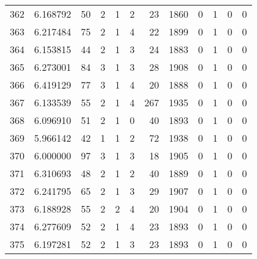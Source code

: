 \begin{tabular}{lrrrrrrrrrrr}
362 &  6.168792 &   50 &      2 &        1 &      2 &              23 &  1860 &               0 &               1 &               0 &               0 \\
363 &  6.217484 &   75 &      2 &        1 &      4 &              22 &  1899 &               0 &               1 &               0 &               0 \\
364 &  6.153815 &   44 &      2 &        1 &      3 &              24 &  1883 &               0 &               1 &               0 &               0 \\
365 &  6.273001 &   84 &      3 &        1 &      3 &              28 &  1908 &               0 &               1 &               0 &               0 \\
366 &  6.419129 &   77 &      3 &        1 &      4 &              20 &  1888 &               0 &               1 &               0 &               0 \\
367 &  6.133539 &   55 &      2 &        1 &      4 &             267 &  1935 &               0 &               1 &               0 &               0 \\
368 &  6.096910 &   51 &      2 &        1 &      0 &              40 &  1893 &               0 &               1 &               0 &               0 \\
369 &  5.966142 &   42 &      1 &        1 &      2 &              72 &  1938 &               0 &               1 &               0 &               0 \\
370 &  6.000000 &   97 &      3 &        1 &      3 &              18 &  1905 &               0 &               1 &               0 &               0 \\
371 &  6.310693 &   48 &      2 &        1 &      2 &              40 &  1889 &               0 &               1 &               0 &               0 \\
372 &  6.241795 &   65 &      2 &        1 &      3 &              29 &  1907 &               0 &               1 &               0 &               0 \\
373 &  6.188928 &   55 &      2 &        2 &      4 &              20 &  1904 &               0 &               1 &               0 &               0 \\
374 &  6.277609 &   52 &      2 &        1 &      4 &              23 &  1893 &               0 &               1 &               0 &               0 \\
375 &  6.197281 &   52 &      2 &        1 &      3 &              23 &  1893 &               0 &               1 &               0 &               0 \\

\end{tabular}
